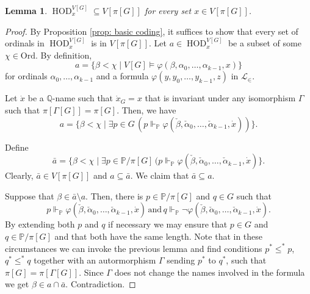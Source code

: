 \documentclass[11pt]{amsart}
\newtheorem{lemma}[theorem]{Lemma}
\theoremstyle{definition}
\theoremstyle{remark}
\DeclareMathOperator{\HOD}{HOD}
\def\s{\subseteq}
\def\forces{\Vdash}
\newcommand\ale[1]{\marginpar{Alejandro: #1}}
\begin{document}
\begin{lemma}
   $\HOD^{V[G]}_x\s V[\pi[G]]$ for every set $x\in V[\pi[G]]$.
\end{lemma}
\begin{proof}
 By Proposition \ref{prop: basic coding}, it suffices to show that every set of ordinals in $\HOD^{V[G]}_x$ is in $V[\pi[G]]$. Let  $a\in \HOD^{V[G]}_x$ be a subset of some $\chi\in \mathrm{Ord}$. By definition, $$a=\{\beta<\chi \mid V[G]\models \varphi(\beta, \alpha_0,\dots, \alpha_{k-1},x)\}$$ for ordinals $\alpha_0,\dots,\alpha_{k-1}$ and a formula $\varphi(y, y_0,\dots, y_{k-1},z)$ in $\mathcal{L}_\in$.

 \smallskip

 {Let $\dot{x}$ be a $\mathbb{Q}$-name such that $\dot{x}_G=x$ that is invariant under any isomorphism $\Gamma$ such that $\pi[\Gamma[G]]=\pi[G]$}. Then, we have
 $$a=\{\beta<\chi\mid \exists p\in G\, (p\forces_{\mathbb{P}}\varphi(\check{\beta}, \check{\alpha}_0,\dots,\check{\alpha}_{k-1},\dot{x}))\}.$$

 \smallskip
 
 Define $$\bar{a}=\{\beta<\chi\mid \exists p\in \mathbb{P}/\pi[G]\, (p\forces_{\mathbb{P}}\varphi(\check{\beta}, \check{\alpha}_0,\dots,\check{\alpha}_{k-1},\dot{x})\}.$$ Clearly, $\bar{a}\in V[\pi[G]]$ and $a\s \bar{a}$. We claim that $\bar{a}\s a.$

 \smallskip

 Suppose that $\beta\in \bar{a}\setminus a$. Then, there is $p\in \mathbb{P}/\pi[G]$ and $q\in G$ such that 
 $$p\forces_{\mathbb{P}}\varphi(\check{\beta}, \check{\alpha}_0,\dots,\check{\alpha}_{k-1},\dot{x})\,\text{and}\,
 q\forces_{\mathbb{P}}\neg \varphi(\check{\beta}, \check{\alpha}_0,\dots,\check{\alpha}_{k-1},\dot{x}).$$
 By extending both $p$ and $q$ if necessary we may ensure that $p\in G$ and $q\in \mathbb{P}/\pi[G]$ and that both have the same length. Note that in these circumstances we can invoke the previous lemma and find conditions $p^*\leq^* p$, $q^*\leq^* q$ together with an autormorphism $\Gamma$ sending $p^*$ to $q^*$, such that $\pi[G]=\pi[\Gamma[G]]$. Since $\Gamma$ does not change the  names involved in the  formula we get  $\beta \in a\cap \bar a$. Contradiction.
\end{proof}
\end{document}
